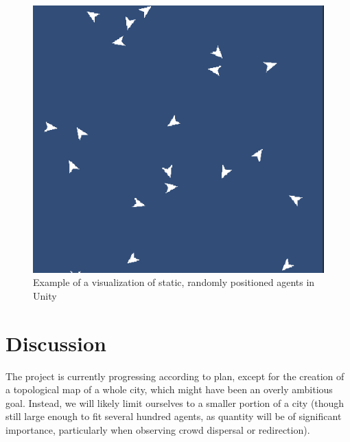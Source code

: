 \documentclass[9pt]{pnas-new}
\begin{document}
\begin{figure}[H]
\begin{center}
\includegraphics[width=0.8\columnwidth]{unity_visualization.png}
\end{center}
\caption{Example of a visualization of static, randomly positioned agents in Unity}
\label{fig1}
\end{figure}


\section*{Discussion}

The project is currently progressing according to plan, except for the creation of a topological map of a whole city, which might have been an overly ambitious goal. Instead, we will likely limit ourselves to a smaller portion of a city (though still large enough to fit several hundred agents, as quantity will be of significant importance, particularly when observing crowd dispersal or redirection). 


\showacknow %


\begin{multicols}{2}
\section*{\bibname}

\end{multicols}
\end{document}

